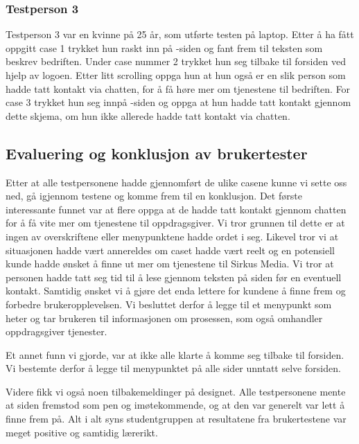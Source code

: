 \subsubsection{Testperson 3}
Testperson 3 var en kvinne på 25 år, som utførte testen på laptop. Etter å ha fått oppgitt case 1 trykket hun raskt inn på -siden og fant frem til teksten som beskrev bedriften. Under case nummer 2 trykket hun seg tilbake til forsiden ved hjelp av logoen. Etter litt scrolling oppga hun at hun også er en slik person som hadde tatt kontakt via chatten, for å få høre mer om tjenestene til bedriften. For case 3 trykket hun seg innpå -siden og oppga at hun hadde tatt kontakt gjennom dette skjema, om hun ikke allerede hadde tatt kontakt via chatten. 

\subsection{Evaluering og konklusjon av brukertester}
Etter at alle testpersonene hadde gjennomført de ulike casene kunne vi sette oss ned, gå igjennom testene og komme frem til en konklusjon. Det første interessante funnet var at flere oppga at de hadde tatt kontakt gjennom chatten for å få vite mer om tjenestene til oppdragsgiver. Vi tror grunnen til dette er at ingen av overskriftene eller menypunktene hadde ordet  i seg. Likevel tror vi at situasjonen hadde vært annereldes om caset hadde vært reelt og en potensiell kunde hadde ønsket å finne ut mer om tjenestene til Sirkus Media. Vi tror at personen hadde tatt seg tid til å lese gjennom teksten på siden før en eventuell kontakt. Samtidig ønsket vi å gjøre det enda lettere for kundene å finne frem og forbedre brukeropplevelsen. Vi besluttet derfor å legge til et menypunkt som heter  og tar brukeren til informasjonen om prosessen, som også omhandler oppdragsgiver tjenester.

Et annet funn vi gjorde, var at ikke alle klarte å komme seg tilbake til forsiden. Vi bestemte derfor å legge til menypunktet  på alle sider unntatt selve forsiden.

Videre fikk vi også noen tilbakemeldinger på designet. Alle testpersonene mente at siden fremstod som pen og imøtekommende, og at den var generelt var lett å finne frem på. Alt i alt syns studentgruppen at resultatene fra brukertestene var meget positive og samtidig lærerikt.

